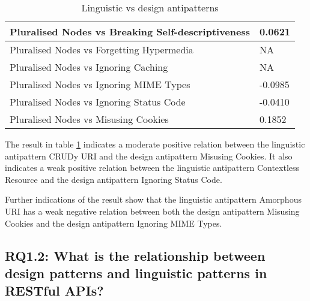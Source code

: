 \documentclass[a4paper,12pt]{article}
\begin{document}
\begin{table}[hbt!]
\begin{tabular}{|p{90mm}|p{50mm}|}
\\ \hline
Pluralised Nodes vs Breaking Self-descriptiveness & 0.0621
\\ \hline
Pluralised Nodes vs Forgetting Hypermedia & NA
\\ \hline
Pluralised Nodes vs Ignoring Caching & NA
\\ \hline
Pluralised Nodes vs Ignoring MIME Types & -0.0985
\\ \hline
Pluralised Nodes vs Ignoring Status Code & -0.0410
\\ \hline
Pluralised Nodes vs Misusing Cookies & 0.1852
\\ \hline
    \end{tabular}
    \caption{Linguistic vs design antipatterns}
    \label{tab:Linguistic vs design antipatterns}
\end{table}

\clearpage

The result in table \ref{tab:Linguistic vs design antipatterns} indicates a moderate positive relation between the linguistic antipattern CRUDy URI and the design antipattern Misusing Cookies. It also indicates a weak positive relation between the linguistic antipattern Contextless Resource and the design antipattern Ignoring Status Code. 

Further indications of the result show that the linguistic antipattern Amorphous URI has a weak negative relation between both the design antipattern Misusing Cookies and the design antipattern Ignoring MIME Types. 

\subsection{\textbf{RQ1.2:} What is the relationship between design patterns and linguistic patterns in RESTful APIs?}
\end{document}
